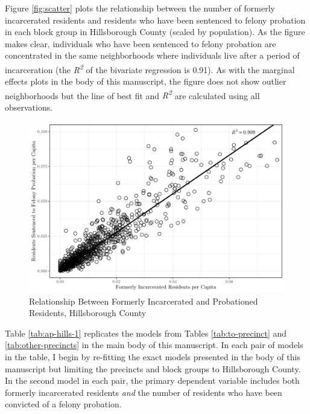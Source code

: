 \documentclass[
  12pt,
]{article}
\begin{document}
Figure \ref{fig:scatter} plots the relationship between the number of formerly incarcerated residents and residents who have been sentenced to felony probation in each block group in Hillsborough County (scaled by population). As the figure makes clear, individuals who have been sentenced to felony probation are concentrated in the same neighborhoods where individuals live after a period of incarceration (the \emph{R\textsuperscript{2}} of the bivariate regression is 0.91). As with the marginal effects plots in the body of this manuscript, the figure does not show outlier neighborhoods but the line of best fit and \emph{R\textsuperscript{2}} are calculated using all observations.

\begin{figure}[H]

{\centering \includegraphics{amendment_4_turnout_files/figure-latex/corrplot-1} 

}

\caption{\label{fig:scatter}Relationship Between Formerly Incarcerated and Probationed Residents, Hillsborough County}\label{fig:corrplot}
\end{figure}

Table \ref{tab:ap-hills-1} replicates the models from Tables \ref{tab:to-precinct} and \ref{tab:other-precincts} in the main body of this manuscript. In each pair of models in the table, I begin by re-fitting the exact models presented in the body of this manuscript but limiting the precincts and block groups to Hillsborough County. In the second model in each pair, the primary dependent variable includes both formerly incarcerated residents \emph{and} the number of residents who have been convicted of a felony probation.
\end{document}
